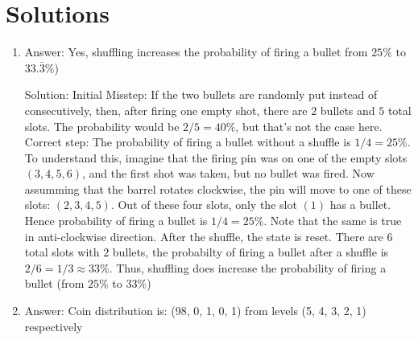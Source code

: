 \section{Solutions}
\begin{enumerate}

\item
Answer: Yes, shuffling increases the probability of firing a bullet from $25\%$ to $33.\bar{3}\%$)
 
Solution: Initial Misstep: If the two bullets are randomly put instead of consecutively, then, after firing one empty shot, there are $2$ bullets and $5$ total slots. The probability would be $2/5 = 40\%$, but that's not the case here.
Correct step: The probability of firing a bullet without a shuffle is $1/4 = 25\%$. To understand this, imagine that the firing pin was on one of the empty slots $(3, 4, 5, 6)$, and the first shot was taken, but no bullet was fired. Now assumming that the barrel rotates clockwise, the pin will move to one of these slots: $(2, 3, 4, 5)$. Out of these four slots, only the slot $(1)$ has a bullet. Hence probability of firing a bullet is $1/4 = 25\%$.
Note that the same is true in anti-clockwise direction.
After the shuffle, the state is reset. There are $6$ total slots with $2$ bullets, the probabilty of firing a bullet after a shuffle is $2/6 = 1/3 \approx 33\% $.
Thus, shuffling does increase the probability of firing a bullet (from $25\%$ to $33\%$)




\item
Answer: Coin distribution is: (98, 0, 1, 0, 1) from levels (5, 4, 3, 2, 1) respectively
 

\end{enumerate}
